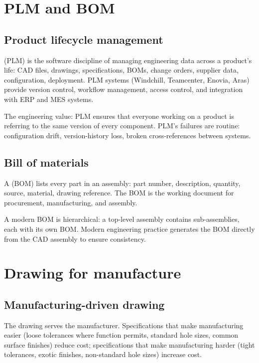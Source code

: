 \section{PLM and BOM}

\subsection{Product lifecycle management}

 (PLM) is the software discipline of managing engineering data across a product's life: CAD files, drawings, specifications, BOMs, change orders, supplier data, configuration, deployment. PLM systems (Windchill, Teamcenter, Enovia, Aras) provide version control, workflow management, access control, and integration with ERP and MES systems.

The engineering value: PLM ensures that everyone working on a product is referring to the same version of every component. PLM's failures are routine: configuration drift, version-history loss, broken cross-references between systems.

\subsection{Bill of materials}

A  (BOM) lists every part in an assembly: part number, description, quantity, source, material, drawing reference. The BOM is the working document for procurement, manufacturing, and assembly.

A modern BOM is hierarchical: a top-level assembly contains sub-assemblies, each with its own BOM. Modern engineering practice generates the BOM directly from the CAD assembly to ensure consistency.

\section{Drawing for manufacture}

\subsection{Manufacturing-driven drawing}

The drawing serves the manufacturer. Specifications that make manufacturing easier (loose tolerances where function permits, standard hole sizes, common surface finishes) reduce cost; specifications that make manufacturing harder (tight tolerances, exotic finishes, non-standard hole sizes) increase cost.

